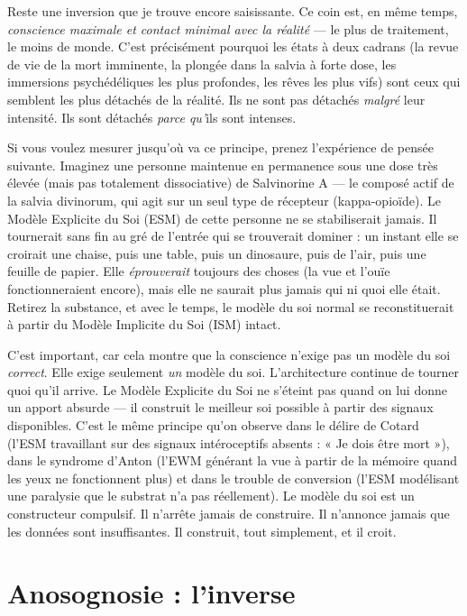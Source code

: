 \documentclass[11pt, twoside, openright]{book}
\begin{document}
Reste une inversion que je trouve encore saisissante. Ce coin est, en même temps, \textit{conscience maximale et contact minimal avec la réalité} --- le plus de traitement, le moins de monde. C'est précisément pourquoi les états à deux cadrans (la revue de vie de la mort imminente, la plongée dans la salvia à forte dose, les immersions psychédéliques les plus profondes, les rêves les plus vifs) sont ceux qui semblent les plus détachés de la réalité. Ils ne sont pas détachés \textit{malgré} leur intensité. Ils sont détachés \textit{parce qu'}ils sont intenses.

Si vous voulez mesurer jusqu'où va ce principe, prenez l'expérience de pensée suivante. Imaginez une personne maintenue en permanence sous une dose très élevée (mais pas totalement dissociative) de Salvinorine A --- le composé actif de la salvia divinorum, qui agit sur un seul type de récepteur (kappa-opioïde). Le Modèle Explicite du Soi (ESM) de cette personne ne se stabiliserait jamais. Il tournerait sans fin au gré de l'entrée qui se trouverait dominer : un instant elle se croirait une chaise, puis une table, puis un dinosaure, puis de l'air, puis une feuille de papier. Elle \textit{éprouverait} toujours des choses (la vue et l'ouïe fonctionneraient encore), mais elle ne saurait plus jamais qui ni quoi elle était. Retirez la substance, et avec le temps, le modèle du soi normal se reconstituerait à partir du Modèle Implicite du Soi (ISM) intact.

C'est important, car cela montre que la conscience n'exige pas un modèle du soi \textit{correct}. Elle exige seulement \textit{un} modèle du soi. L'architecture continue de tourner quoi qu'il arrive. Le Modèle Explicite du Soi ne s'éteint pas quand on lui donne un apport absurde --- il construit le meilleur soi possible à partir des signaux disponibles. C'est le même principe qu'on observe dans le délire de Cotard (l'ESM travaillant sur des signaux intéroceptifs absents : « Je dois être mort »), dans le syndrome d'Anton (l'EWM générant la vue à partir de la mémoire quand les yeux ne fonctionnent plus) et dans le trouble de conversion (l'ESM modélisant une paralysie que le substrat n'a pas réellement). Le modèle du soi est un constructeur compulsif. Il n'arrête jamais de construire. Il n'annonce jamais que les données sont insuffisantes. Il construit, tout simplement, et il croit.

\section*{Anosognosie : l'inverse}
\end{document}
